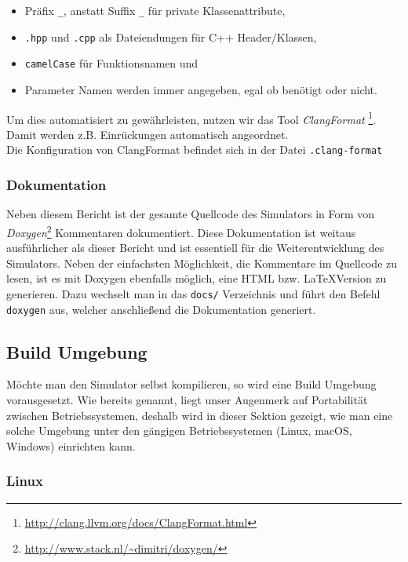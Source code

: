 \begin{itemize}
	\item Präfix \texttt{\_}, anstatt Suffix \texttt{\_} für private Klassenattribute,
	\item \texttt{.hpp} und \texttt{.cpp} als Dateiendungen für C++ Header/Klassen,
	\item \texttt{camelCase} für Funktionsnamen und
	\item Parameter Namen werden immer angegeben, egal ob benötigt oder nicht.
\end{itemize}

Um dies automatisiert zu gewährleisten, nutzen wir das Tool \textit{ClangFormat}
\footnote{\url{http://clang.llvm.org/docs/ClangFormat.html}}. Damit werden
z.B. Einrückungen automatisch angeordnet. \\
Die Konfiguration von ClangFormat befindet sich in der Datei \texttt{.clang-format}

\subsubsection{Dokumentation}

Neben diesem Bericht ist der gesamte Quellcode des Simulators in Form von
\textit{Doxygen}\footnote{\url{http://www.stack.nl/~dimitri/doxygen/}} Kommentaren
dokumentiert. Diese Dokumentation ist weitaus ausführlicher als dieser Bericht und
ist essentiell für die Weiterentwicklung des Simulators. Neben der einfachsten
Möglichkeit, die Kommentare im Quellcode zu lesen, ist es mit Doxygen ebenfalls möglich,
eine HTML bzw. \LaTeX Version zu generieren. Dazu wechselt man in das \texttt{docs/}
Verzeichnis und führt den Befehl \texttt{doxygen} aus, welcher anschließend die
Dokumentation generiert.

\subsection{Build Umgebung}

Möchte man den Simulator selbst kompilieren, so wird eine Build Umgebung vorausgesetzt.
Wie bereits genannt, liegt unser Augenmerk auf Portabilität zwischen Betriebssystemen,
deshalb wird in dieser Sektion gezeigt, wie man eine solche Umgebung unter den gängigen
Betriebssystemen (Linux, macOS, Windows) einrichten kann.

\subsubsection{Linux}

